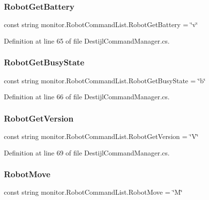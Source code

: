 \subsubsection{Robot\+Get\+Battery}
{\footnotesize\ttfamily const string monitor.\+Robot\+Command\+List.\+Robot\+Get\+Battery = \char`\"{}v\char`\"{}}



Definition at line 65 of file Destijl\+Command\+Manager.\+cs.

\mbox{\label{classmonitor_1_1_robot_command_list_a52a901f4e013dc33ff491c5fcda76860}} 
\subsubsection{Robot\+Get\+Busy\+State}
{\footnotesize\ttfamily const string monitor.\+Robot\+Command\+List.\+Robot\+Get\+Busy\+State = \char`\"{}b\char`\"{}}



Definition at line 66 of file Destijl\+Command\+Manager.\+cs.

\mbox{\label{classmonitor_1_1_robot_command_list_a9a845beb5c040e4813f03cee7cd1cb71}} 
\subsubsection{Robot\+Get\+Version}
{\footnotesize\ttfamily const string monitor.\+Robot\+Command\+List.\+Robot\+Get\+Version = \char`\"{}V\char`\"{}}



Definition at line 69 of file Destijl\+Command\+Manager.\+cs.

\mbox{\label{classmonitor_1_1_robot_command_list_af7017bac04f1976fe1c37e8ec77bcbce}} 
\subsubsection{Robot\+Move}
{\footnotesize\ttfamily const string monitor.\+Robot\+Command\+List.\+Robot\+Move = \char`\"{}M\char`\"{}}



